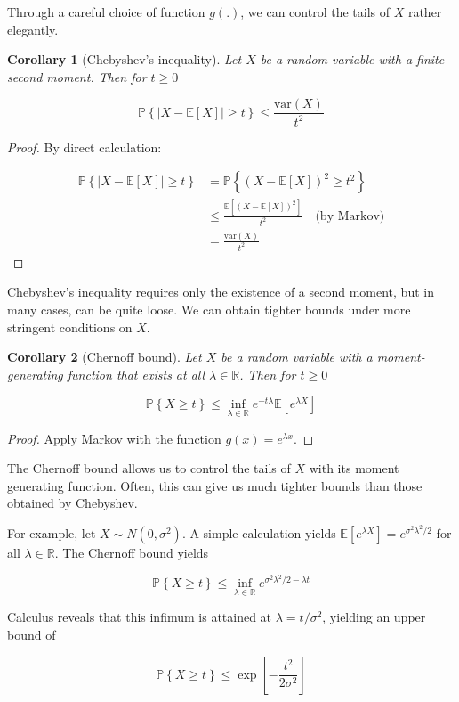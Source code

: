 \documentclass{article}
\newcommand{\R}{\mathbb{R}}
\newcommand{\ev}[1]{\mathbb{E}\left[#1\right]}
\newcommand{\prob}[1]{\mathbb{P}\left\{#1\right\}}
\newcommand{\var}{\textrm{var}}
\newtheorem{corollary}{Corollary}
\begin{document}
Through a careful choice of function $g(.)$, we can control the tails of $X$
rather elegantly.

\begin{corollary}[Chebyshev's inequality]
	Let $X$ be a random variable with a finite second moment. Then for $t
	\geq 0$

	$$\prob{|X - \ev{X}| \geq t} \leq \frac{\var(X)}{t^2}$$
\end{corollary}

\begin{proof}
	By direct calculation:

	\begin{align*}
		\prob{|X - \ev{X}| \geq t} &= \prob{(X - \ev{X})^2 \geq t^2} \\ 
		&\leq \frac{\ev{(X  - \ev{X})^2}}{t^2} \quad \textrm{(by Markov)} \\
		&= \frac{\var(X)}{t^2}
	\end{align*}
\end{proof}

Chebyshev's inequality requires only the existence of a second moment, but in
many cases, can be quite loose. We can obtain tighter bounds under more
stringent conditions on $X$. 

\begin{corollary}[Chernoff bound]
	Let $X$ be a random variable with a moment-generating function that
	exists at all $\lambda \in \R$.  Then for $t \geq 0$

	$$\prob{X \geq t} \leq \inf_{\lambda \in \R}e^{-t\lambda}\ev{e^{\lambda X}}$$
\end{corollary}

\begin{proof}
	Apply Markov with the function $g(x) = e^{\lambda x}$.
\end{proof}

The Chernoff bound allows us to control the tails of $X$ with its moment
generating function. Often, this can give us much tighter bounds than those
obtained by Chebyshev. 

For example, let $X \sim N(0, \sigma^2)$. A simple calculation yields
$\ev{e^{\lambda X}} = e^{\sigma^2 \lambda^2 / 2}$ for all $\lambda \in \R$. The
Chernoff bound yields 

$$\prob{X \geq t} \leq \inf_{\lambda \in \R}e^{\sigma^2\lambda^2/2 - \lambda
t}$$

Calculus reveals that this infimum is attained at $\lambda = t / \sigma^2$,
yielding an upper bound of 

$$\prob{X \geq t} \leq \exp\left[-\frac{t^2}{2\sigma^2}\right]$$
\end{document}
